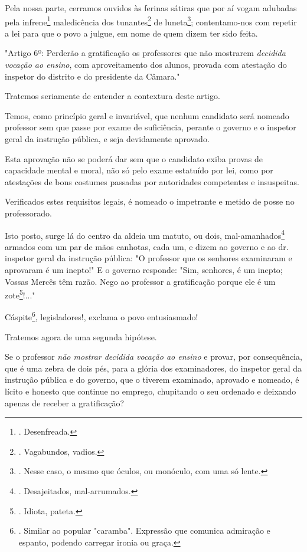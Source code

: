 Pela nossa parte, cerramos ouvidos às ferinas sátiras que por aí vogam
adubadas pela infrene\footnote{. Desenfreada.} maledicência dos
tunantes\footnote{. Vagabundos, vadios.} de luneta\footnote{. Nesse
  caso, o mesmo que óculos, ou monóculo, com uma só lente.};
contentamo-nos com repetir a lei para que o povo a julgue, em nome de
quem dizem ter sido feita.

"Artigo 6º: Perderão a gratificação os professores que não mostrarem
\emph{decidida vocação ao ensino}, com aproveitamento dos alunos,
provada com atestação do inspetor do distrito e do presidente da
Câmara."

Tratemos seriamente de entender a contextura deste artigo.

Temos, como princípio geral e invariável, que nenhum candidato será
nomeado professor sem que passe por exame de suficiência, perante o
governo e o inspetor geral da instrução pública, e seja devidamente
aprovado.

Esta aprovação não se poderá dar sem que o candidato exiba provas de
capacidade mental e moral, não só pelo exame estatuído por lei, como por
atestações de bons costumes passadas por autoridades competentes e
insuspeitas.

Verificados estes requisitos legais, é nomeado o impetrante e metido de
posse no professorado.

Isto posto, surge lá do centro da aldeia um matuto, ou dois,
mal-amanhados\footnote{. Desajeitados, mal-arrumados.} armados com um
par de mãos canhotas, cada um, e dizem ao governo e ao dr. inspetor
geral da instrução pública: "O professor que os senhores examinaram e
aprovaram é um inepto!" E o governo responde: "Sim, senhores, é um
inepto; Vossas Mercês têm razão. Nego ao professor a gratificação porque
ele é um zote\footnote{. Idiota, pateta.}!..."

Cáspite\footnote{. Similar ao popular "caramba". Expressão que comunica
  admiração e espanto, podendo carregar ironia ou graça.},
legisladores!, exclama o povo entusiasmado!

Tratemos agora de uma segunda hipótese.

Se o professor \emph{não mostrar decidida vocação ao ensino} e provar,
por consequência, que é uma zebra de dois pés, para a glória dos
examinadores, do inspetor geral da instrução pública e do governo, que o
tiverem examinado, aprovado e nomeado, é lícito e honesto que continue
no emprego, chupitando o seu ordenado e deixando apenas de receber a
gratificação?

